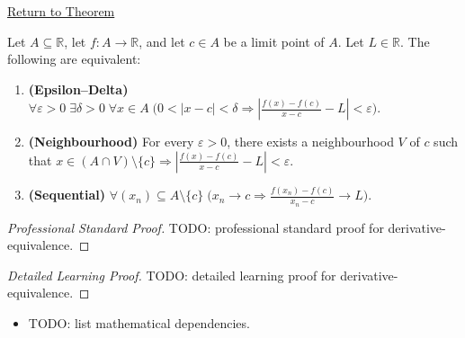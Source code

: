 \newpage
{}
\label{prf:derivative-equivalence}

\begin{remark*}[Return]
\hyperref[thm:derivative-equivalence]{Return to Theorem}
\end{remark*}

\begin{theorem*}
Let $A \subseteq \mathbb{R}$, let $f : A \to \mathbb{R}$, and let $c \in A$ be a limit point of $A$. Let $L \in \mathbb{R}$. The following are equivalent:
\begin{enumerate}[label=(\roman*)]
\item \textbf{(Epsilon--Delta)} $\forall \varepsilon > 0\;\exists \delta > 0\;\forall x \in A\;\bigl(0 < |x-c| < \delta \Rightarrow \left|\tfrac{f(x)-f(c)}{x-c} - L\right| < \varepsilon\bigr)$.
\item \textbf{(Neighbourhood)} For every $\varepsilon > 0$, there exists a neighbourhood $V$ of $c$ such that $x \in (A \cap V) \setminus \{c\} \Rightarrow \left|\tfrac{f(x)-f(c)}{x-c} - L\right| < \varepsilon$.
\item \textbf{(Sequential)} $\forall (x_n) \subseteq A \setminus \{c\}\;\bigl(x_n \to c \Rightarrow \tfrac{f(x_n)-f(c)}{x_n-c} \to L\bigr)$.
\end{enumerate}
\end{theorem*}

\begin{proof}[Professional Standard Proof]
\LRAProofBodyStart
TODO: professional standard proof for derivative-equivalence.
\end{proof}

\begin{proof}[Detailed Learning Proof]
\LRAProofBodyStart
TODO: detailed learning proof for derivative-equivalence.
\end{proof}

\begin{remark*}
\end{remark*}

\begin{dependencies}
\begin{itemize}
  \item TODO: list mathematical dependencies.
\end{itemize}
\end{dependencies}

\clearpage
